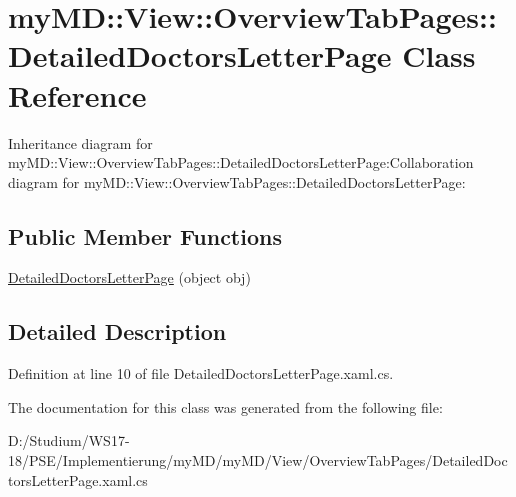 \hypertarget{classmy_m_d_1_1_view_1_1_overview_tab_pages_1_1_detailed_doctors_letter_page}{
\section{my\-MD::View::Overview\-Tab\-Pages::Detailed\-Doctors\-Letter\-Page Class Reference}
\label{d5/d00/classmy_m_d_1_1_view_1_1_overview_tab_pages_1_1_detailed_doctors_letter_page}
}
Inheritance diagram for my\-MD::View::Overview\-Tab\-Pages::Detailed\-Doctors\-Letter\-Page:Collaboration diagram for my\-MD::View::Overview\-Tab\-Pages::Detailed\-Doctors\-Letter\-Page:\subsection*{Public Member Functions}
\begin{CompactItemize}
\item 
\hypertarget{classmy_m_d_1_1_view_1_1_overview_tab_pages_1_1_detailed_doctors_letter_page_401d0b6014f173bdcc7712470abfec07}{
\hyperlink{classmy_m_d_1_1_view_1_1_overview_tab_pages_1_1_detailed_doctors_letter_page_401d0b6014f173bdcc7712470abfec07}{Detailed\-Doctors\-Letter\-Page} (object obj)}
\label{d5/d00/classmy_m_d_1_1_view_1_1_overview_tab_pages_1_1_detailed_doctors_letter_page_401d0b6014f173bdcc7712470abfec07}

\end{CompactItemize}


\subsection{Detailed Description}




Definition at line 10 of file Detailed\-Doctors\-Letter\-Page.xaml.cs.

The documentation for this class was generated from the following file:\begin{CompactItemize}
\item 
D:/Studium/WS17-18/PSE/Implementierung/my\-MD/my\-MD/View/Overview\-Tab\-Pages/Detailed\-Doctors\-Letter\-Page.xaml.cs\end{CompactItemize}

